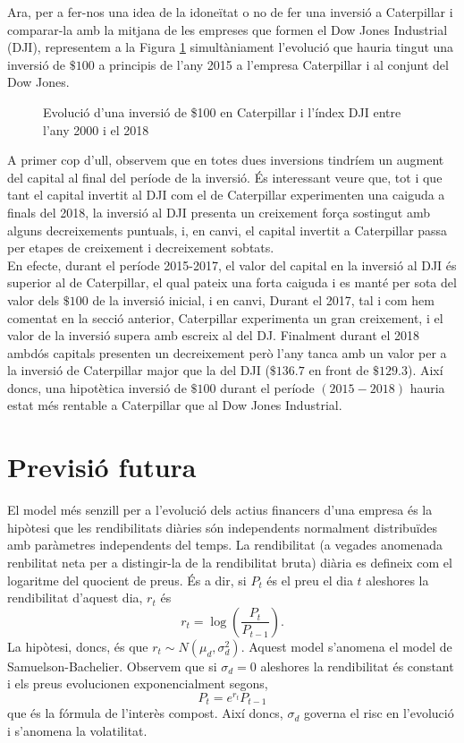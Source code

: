 \documentclass{article}
\numberwithin{table}{section}
\numberwithin{figure}{section}
\numberwithin{equation}{section}
\begin{document}
Ara, per a fer-nos una idea de la idoneïtat o no de fer una inversió a Caterpillar i comparar-la amb la mitjana de les empreses que formen el Dow Jones Industrial (DJI), representem a la Figura \ref{fig:inversio} simultàniament l'evolució que hauria tingut una inversió de $\$100$ a principis de l'any 2015 a l'empresa Caterpillar i al conjunt del Dow Jones.
\begin{figure}[H]
\centering \sffamily \small

\caption{Evolució d'una inversió de \$100 en Caterpillar i l'índex DJI entre l'any 2000 i el 2018}
\label{fig:inversio}
\end{figure}

A primer cop d'ull, observem que en totes dues inversions tindríem un augment del capital al final del període de la inversió. És interessant veure que, tot i que tant el capital invertit al DJI com el de Caterpillar experimenten una caiguda a finals del 2018, la inversió al DJI presenta un creixement força sostingut amb alguns decreixements puntuals, i, en canvi, el capital invertit a Caterpillar passa per etapes de creixement i decreixement sobtats.\\
En efecte, durant el període 2015-2017, el valor del capital en la inversió al DJI és superior al de Caterpillar, el qual pateix una forta caiguda i es manté per sota del valor dels $\$100$ de la inversió inicial, i en canvi, Durant el 2017, tal i com hem comentat en la secció anterior, Caterpillar experimenta un gran creixement, i el valor de la inversió supera amb escreix al del DJ. Finalment durant el 2018 ambdós capitals presenten un decreixement però l'any tanca amb un valor per a la inversió de Caterpillar major que la del DJI  ($\$136.7$ en front de  $\$129.3$). Així doncs, una hipotètica inversió de $\$100$ durant el període $(2015-2018)$ hauria estat més rentable a Caterpillar que al Dow Jones Industrial.





\section{Previsió futura}
El model més senzill per a l'evolució dels actius financers d'una empresa és la hipòtesi que les rendibilitats diàries són independents normalment distribuïdes amb paràmetres independents del temps. La rendibilitat (a vegades anomenada renbilitat neta per a distingir-la de la rendibilitat bruta) diària es defineix com el logaritme del quocient de preus. És a dir, si \( P_t \) és el preu el dia \( t \) aleshores la rendibilitat d'aquest dia, \( r_t \) és
\begin{equation*}
	r_t = \log{\left(\frac{P_t}{P_{t-1}}\right)}.
\end{equation*}
La hipòtesi, doncs, és que \( r_t \sim N(\mu_d, \sigma_d^2) \). Aquest model s'anomena el model de Samuelson-Bachelier. Observem que si \( \sigma_d = 0 \) aleshores la rendibilitat és constant i els preus evolucionen exponencialment segons,
\begin{equation*}
	P_t = e^{r_t}P_{t-1}
\end{equation*}
que és la fórmula de l'interès compost. Així doncs, \( \sigma_d \) governa el risc en l'evolució i s'anomena la volatilitat. 
\end{document}
